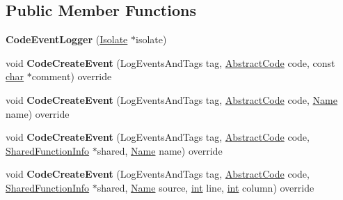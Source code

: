 \subsection*{Public Member Functions}
\begin{DoxyCompactItemize}
\item 
\mbox{\label{classv8_1_1internal_1_1CodeEventLogger_a8553671ae8351a988223bfa9bcbed078}} 
{\bfseries Code\+Event\+Logger} (\mbox{\hyperlink{classv8_1_1internal_1_1Isolate}{Isolate}} $\ast$isolate)
\item 
\mbox{\label{classv8_1_1internal_1_1CodeEventLogger_abcac8fc9021e57ad92afdc91f3b88ce6}} 
void {\bfseries Code\+Create\+Event} (Log\+Events\+And\+Tags tag, \mbox{\hyperlink{classv8_1_1internal_1_1AbstractCode}{Abstract\+Code}} code, const \mbox{\hyperlink{classchar}{char}} $\ast$comment) override
\item 
\mbox{\label{classv8_1_1internal_1_1CodeEventLogger_a10c9c74520b851ac08d1bbf8b392c08c}} 
void {\bfseries Code\+Create\+Event} (Log\+Events\+And\+Tags tag, \mbox{\hyperlink{classv8_1_1internal_1_1AbstractCode}{Abstract\+Code}} code, \mbox{\hyperlink{classv8_1_1internal_1_1Name}{Name}} name) override
\item 
\mbox{\label{classv8_1_1internal_1_1CodeEventLogger_a719946d120f43e92c8aa849e971968fc}} 
void {\bfseries Code\+Create\+Event} (Log\+Events\+And\+Tags tag, \mbox{\hyperlink{classv8_1_1internal_1_1AbstractCode}{Abstract\+Code}} code, \mbox{\hyperlink{classv8_1_1internal_1_1SharedFunctionInfo}{Shared\+Function\+Info}} $\ast$shared, \mbox{\hyperlink{classv8_1_1internal_1_1Name}{Name}} name) override
\item 
\mbox{\label{classv8_1_1internal_1_1CodeEventLogger_afc418ca1522b16d631f4ecdc28e84205}} 
void {\bfseries Code\+Create\+Event} (Log\+Events\+And\+Tags tag, \mbox{\hyperlink{classv8_1_1internal_1_1AbstractCode}{Abstract\+Code}} code, \mbox{\hyperlink{classv8_1_1internal_1_1SharedFunctionInfo}{Shared\+Function\+Info}} $\ast$shared, \mbox{\hyperlink{classv8_1_1internal_1_1Name}{Name}} source, \mbox{\hyperlink{classint}{int}} line, \mbox{\hyperlink{classint}{int}} column) override

\end{DoxyCompactItemize}
